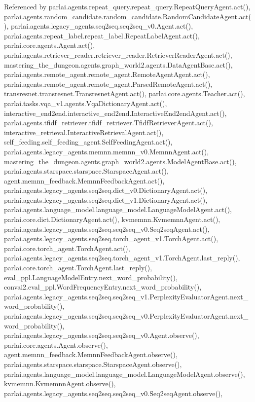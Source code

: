 Referenced by parlai.\+agents.\+repeat\+\_\+query.\+repeat\+\_\+query.\+Repeat\+Query\+Agent.\+act(), parlai.\+agents.\+random\+\_\+candidate.\+random\+\_\+candidate.\+Random\+Candidate\+Agent.\+act(), parlai.\+agents.\+legacy\+\_\+agents.\+seq2seq.\+seq2seq\+\_\+v0.\+Agent.\+act(), parlai.\+agents.\+repeat\+\_\+label.\+repeat\+\_\+label.\+Repeat\+Label\+Agent.\+act(), parlai.\+core.\+agents.\+Agent.\+act(), parlai.\+agents.\+retriever\+\_\+reader.\+retriever\+\_\+reader.\+Retriever\+Reader\+Agent.\+act(), mastering\+\_\+the\+\_\+dungeon.\+agents.\+graph\+\_\+world2.\+agents.\+Data\+Agent\+Base.\+act(), parlai.\+agents.\+remote\+\_\+agent.\+remote\+\_\+agent.\+Remote\+Agent\+Agent.\+act(), parlai.\+agents.\+remote\+\_\+agent.\+remote\+\_\+agent.\+Parsed\+Remote\+Agent.\+act(), transresnet.\+transresnet.\+Transresnet\+Agent.\+act(), parlai.\+core.\+agents.\+Teacher.\+act(), parlai.\+tasks.\+vqa\+\_\+v1.\+agents.\+Vqa\+Dictionary\+Agent.\+act(), interactive\+\_\+end2end.\+interactive\+\_\+end2end.\+Interactive\+End2end\+Agent.\+act(), parlai.\+agents.\+tfidf\+\_\+retriever.\+tfidf\+\_\+retriever.\+Tfidf\+Retriever\+Agent.\+act(), interactive\+\_\+retrieval.\+Interactive\+Retrieval\+Agent.\+act(), self\+\_\+feeding.\+self\+\_\+feeding\+\_\+agent.\+Self\+Feeding\+Agent.\+act(), parlai.\+agents.\+legacy\+\_\+agents.\+memnn.\+memnn\+\_\+v0.\+Memnn\+Agent.\+act(), mastering\+\_\+the\+\_\+dungeon.\+agents.\+graph\+\_\+world2.\+agents.\+Model\+Agent\+Base.\+act(), parlai.\+agents.\+starspace.\+starspace.\+Starspace\+Agent.\+act(), agent.\+memnn\+\_\+feedback.\+Memnn\+Feedback\+Agent.\+act(), parlai.\+agents.\+legacy\+\_\+agents.\+seq2seq.\+dict\+\_\+v0.\+Dictionary\+Agent.\+act(), parlai.\+agents.\+legacy\+\_\+agents.\+seq2seq.\+dict\+\_\+v1.\+Dictionary\+Agent.\+act(), parlai.\+agents.\+language\+\_\+model.\+language\+\_\+model.\+Language\+Model\+Agent.\+act(), parlai.\+core.\+dict.\+Dictionary\+Agent.\+act(), kvmemnn.\+Kvmemnn\+Agent.\+act(), parlai.\+agents.\+legacy\+\_\+agents.\+seq2seq.\+seq2seq\+\_\+v0.\+Seq2seq\+Agent.\+act(), parlai.\+agents.\+legacy\+\_\+agents.\+seq2seq.\+torch\+\_\+agent\+\_\+v1.\+Torch\+Agent.\+act(), parlai.\+core.\+torch\+\_\+agent.\+Torch\+Agent.\+act(), parlai.\+agents.\+legacy\+\_\+agents.\+seq2seq.\+torch\+\_\+agent\+\_\+v1.\+Torch\+Agent.\+last\+\_\+reply(), parlai.\+core.\+torch\+\_\+agent.\+Torch\+Agent.\+last\+\_\+reply(), eval\+\_\+ppl.\+Language\+Model\+Entry.\+next\+\_\+word\+\_\+probability(), convai2.\+eval\+\_\+ppl.\+Word\+Frequency\+Entry.\+next\+\_\+word\+\_\+probability(), parlai.\+agents.\+legacy\+\_\+agents.\+seq2seq.\+seq2seq\+\_\+v1.\+Perplexity\+Evaluator\+Agent.\+next\+\_\+word\+\_\+probability(), parlai.\+agents.\+legacy\+\_\+agents.\+seq2seq.\+seq2seq\+\_\+v0.\+Perplexity\+Evaluator\+Agent.\+next\+\_\+word\+\_\+probability(), parlai.\+agents.\+legacy\+\_\+agents.\+seq2seq.\+seq2seq\+\_\+v0.\+Agent.\+observe(), parlai.\+core.\+agents.\+Agent.\+observe(), agent.\+memnn\+\_\+feedback.\+Memnn\+Feedback\+Agent.\+observe(), parlai.\+agents.\+starspace.\+starspace.\+Starspace\+Agent.\+observe(), parlai.\+agents.\+language\+\_\+model.\+language\+\_\+model.\+Language\+Model\+Agent.\+observe(), kvmemnn.\+Kvmemnn\+Agent.\+observe(), parlai.\+agents.\+legacy\+\_\+agents.\+seq2seq.\+seq2seq\+\_\+v0.\+Seq2seq\+Agent.\+observe(), 